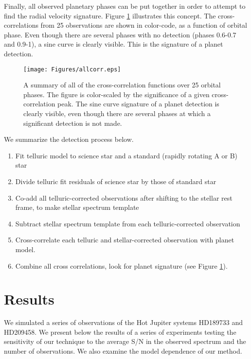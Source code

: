 \documentclass[11pt]{report}     %
\begin{document}
Finally, all observed planetary phases can be put together in order to attempt
to find the radial velocity signature. Figure \ref{fig:allcorr}
illustrates this concept. The cross-correlations from 25 observations
are shown in color-code, as a function of orbital phase. Even though
there are several phases with no detection (phases 0.6-0.7 and 0.9-1),
a sine curve is clearly visible. This is the signature of a planet
detection. 


\begin{figure}[ht]
  \centering
  \texttt{[image: Figures/allcorr.eps]}
  \caption{A summary of all of the cross-correlation functions over
    25 orbital phases. The figure is color-scaled by the significance
    of a given cross-correlation peak. The sine curve signature of a
    planet detection is clearly visible, even though there are several
    phases at which a significant detection is not made.}
  \label{fig:allcorr}
\end{figure}

We summarize the detection process below.
\begin{enumerate}
\item Fit telluric model to science star and a standard (rapidly rotating A or B) star
\item Divide telluric fit residuals of science star by those of standard star
\item Co-add all telluric-corrected observations after shifting to the stellar rest frame, to make stellar spectrum template
\item Subtract stellar spectrum template from each telluric-corrected observation
\item Cross-correlate each telluric and stellar-corrected observation with planet model.
\item Combine all cross correlations, look for planet signature (see Figure \ref{fig:allcorr}).
\end{enumerate}


\section{Results}
\label{sec:results2}
We simulated a series of observations of the Hot Jupiter systems
HD189733 and HD209458. We
present below the results of a series of experiments testing the
sensitivity of our technique to the average S/N in the observed
spectrum and the number of observations. We also examine the
model dependence of our method. 
\end{document}
